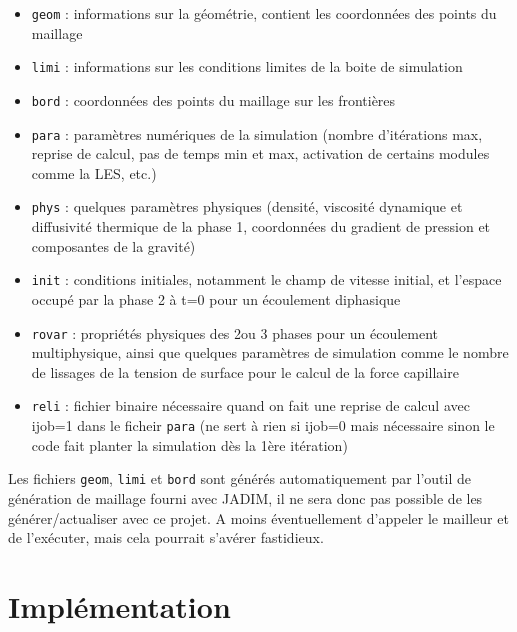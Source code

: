 \documentclass{article} %
\newcommand{\code}[1]{\colorbox{light-gray}{\texttt{#1}}}
\begin{document}
\begin{itemize}
    \item   \code{geom} : informations sur la géométrie, contient les coordonnées des points du maillage
    \item   \code{limi} : informations sur les conditions limites de la boite de simulation
    \item   \code{bord} : coordonnées des points du maillage sur les frontières
    \item   \code{para} : paramètres numériques de la simulation (nombre d'itérations max, reprise de calcul, pas de temps min et max, activation de certains modules comme la LES, etc.)
    \item   \code{phys} : quelques paramètres physiques (densité, viscosité dynamique et diffusivité thermique de la phase 1, coordonnées du gradient de pression et composantes de la gravité)
    \item   \code{init} : conditions initiales, notamment le champ de vitesse initial, et l'espace occupé par la phase 2 à t=0 pour un écoulement diphasique
    \item   \code{rovar} : propriétés physiques des 2ou 3 phases pour un écoulement multiphysique, ainsi que quelques paramètres de simulation comme le nombre de lissages de la tension de surface pour le calcul de la force capillaire
    \item   \code{reli} : fichier binaire nécessaire quand on fait une reprise de calcul avec ijob=1 dans le ficheir \code{para} (ne sert à rien si ijob=0 mais nécessaire sinon le code fait planter la simulation dès la 1ère itération)
\end{itemize}

Les fichiers \code{geom}, \code{limi} et \code{bord} sont générés automatiquement par l'outil de génération de maillage fourni avec JADIM, il ne sera donc pas possible de les générer/actualiser avec ce projet. A moins éventuellement d'appeler le mailleur et de l'exécuter, mais cela pourrait s'avérer fastidieux.



\section{Implémentation}
\end{document}
